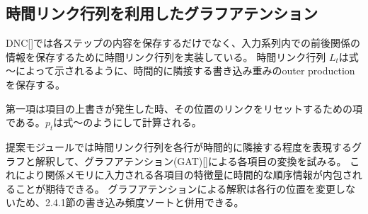 \subsection{時間リンク行列を利用したグラフアテンション}
DNC[]では各ステップの内容を保存するだけでなく、入力系列内での前後関係の情報を保存するために時間リンク行列を実装している。
時間リンク行列 $L_t$は式～によって示されるように、時間的に隣接する書き込み重みのouter productionを保存する。
 
第一項は項目の上書きが発生した時、その位置のリンクをリセットするための項である。$p_t$は式～のようにして計算される。
 
提案モジュールでは時間リンク行列を各行が時間的に隣接する程度を表現するグラフと解釈して、グラフアテンション(GAT)[]による各項目の変換を試みる。
これにより関係メモリに入力される各項目の特徴量に時間的な順序情報が内包されることが期待できる。
グラフアテンションによる解釈は各行の位置を変更しないため、2.4.1節の書き込み頻度ソートと併用できる。


